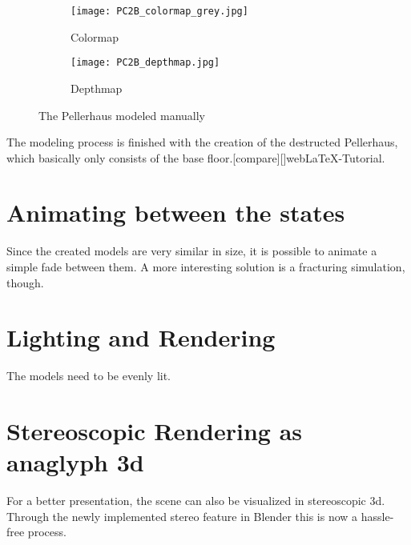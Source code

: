 \begin{figure}[h]
	\centering
	\begin{subfigure}[b]{0.45\textwidth}
		\centering
		\texttt{[image: PC2B\_colormap\_grey.jpg]}
		\caption{Colormap}
		\label{fig:PC2B_colormap_grey}
	\end{subfigure}
	\hfill
	\begin{subfigure}[b]{0.45\textwidth}
		\centering
		\texttt{[image: PC2B\_depthmap.jpg]}
		\caption{Depthmap}
		\label{fig:PC2B_depthmap}
	\end{subfigure}
	\caption{The Pellerhaus modeled manually}
	\label{fig:pellerhaus_3d_models}
\end{figure}





The modeling process is finished with the creation of the destructed Pellerhaus, which basically only consists of the base floor.[compare][]{webLaTeX-Tutorial}.

\section{Animating between the states}

Since the created models are very similar in size, it is possible to animate a simple fade between them.
A more interesting solution is a fracturing simulation, though.

\section{Lighting and Rendering}

The models need to be evenly lit.

\section{Stereoscopic Rendering as anaglyph 3d}

For a better presentation, the scene can also be visualized in stereoscopic 3d. Through the newly implemented stereo feature in Blender this is now a hassle-free process.